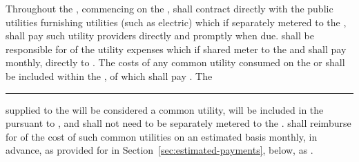 Throughout the \termOfLease, commencing on the \deliveryDate, \lessee shall contract directly with the public utilities furnishing utilities (such as electric) which if separately metered to the \premises, shall pay such utility providers directly and promptly when due. \lessee shall be responsible for \lesseesPercentage of the utility expenses which if shared meter to the \premises and shall pay monthly, directly to \lessor. The costs of any common utility consumed on the \building or \commonAreas shall be included within the \additionalRent, of which \lessee shall pay \lesseesPercentage. The \rule{2cm}{0.4pt} supplied to the \building will be considered a common utility, will be included in the \additionalRent pursuant to \lesseesPercentage, and shall not need to be separately metered to the \premises. \lessee shall reimburse \lessor for \lesseesPercentage of the cost of such common utilities on an estimated basis monthly, in advance, as provided for in Section~\ref{sec:estimated-payments}, below, as \additionalRent.
